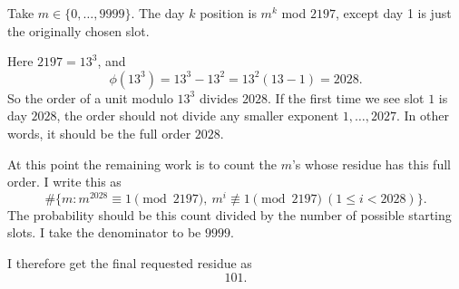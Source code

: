 Take \(m\in\{0,\ldots,9999\}\).  The day \(k\) position is \(m^k\) mod \(2197\), except day 1 is just the originally chosen slot.

Here \(2197=13^3\), and
\[
\phi(13^3)=13^3-13^2=13^2(13-1)=2028.
\]
So the order of a unit modulo \(13^3\) divides \(2028\).  If the first time we see slot \(1\) is day \(2028\), the order should not divide any smaller exponent \(1,\ldots,2027\).  In other words, it should be the full order \(2028\).

At this point the remaining work is to count the \(m\)'s whose residue has this full order.  I write this as
\[
\#\{m:m^{2028}\equiv1\pmod {2197},\ m^i\not\equiv1\pmod {2197}\ (1\le i<2028)\}.
\]
The probability should be this count divided by the number of possible starting slots.  I take the denominator to be \(9999\).

I therefore get the final requested residue as
\[
\boxed{101}.
\]
